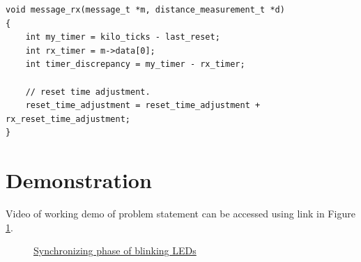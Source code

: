 \begin{verbatim}
void message_rx(message_t *m, distance_measurement_t *d)
{
    int my_timer = kilo_ticks - last_reset;
    int rx_timer = m->data[0];
    int timer_discrepancy = my_timer - rx_timer;
    
    // reset time adjustment.
    reset_time_adjustment = reset_time_adjustment + 	rx_reset_time_adjustment;
}
\end{verbatim}

\section{Demonstration}
Video of working demo of problem statement can be accessed using link in Figure \ref{fig:sync_lights}.
\begin{figure}[H]
	\centering
	\caption{\href{https://photos.app.goo.gl/nvWXb5ziksYnx73s6}{Synchronizing phase of blinking LEDs}}
	\label{fig:sync_lights}
\end{figure}
